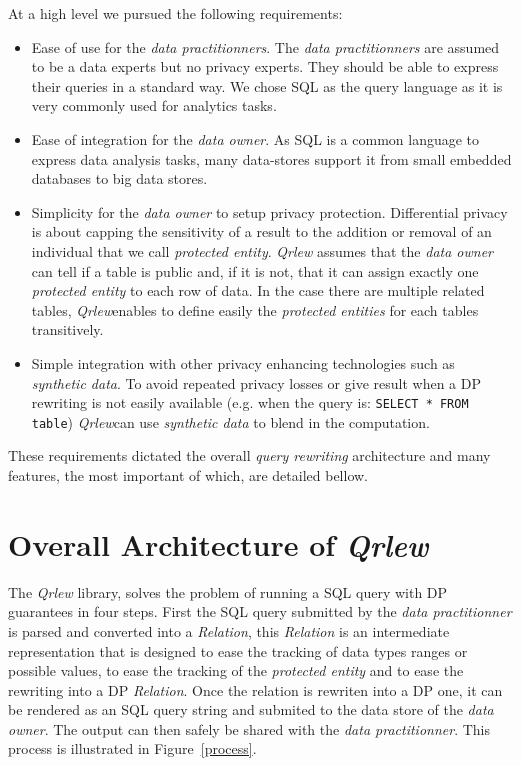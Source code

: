 \documentclass[letterpaper]{article} %
\newcommand{\qrlew}{\emph{Qrlew}}
\begin{document}
At a high level we pursued the following requirements:
\begin{itemize}
    \item Ease of use for the \emph{data practitionners}. The \emph{data practitionners} are assumed to be a data experts but no privacy experts. They should be able to express their queries in a standard way. We chose SQL as the query language as it is very commonly used for analytics tasks.
    \item Ease of integration for the \emph{data owner}. As SQL is a common language to express data analysis tasks, many data-stores support it from small embedded databases to big data stores.
    \item Simplicity for the \emph{data owner} to setup privacy protection. Differential privacy is about capping the sensitivity of a result to the addition or removal of an individual that we call \emph{protected entity}. \qrlew{} assumes that the \emph{data owner} can tell if a table is public and, if it is not, that it can assign exactly one \emph{protected entity} to each row of data. In the case there are multiple related tables, \qrlew enables to define easily the \emph{protected entities} for each tables transitively.
    \item Simple integration with other privacy enhancing technologies such as \emph{synthetic data}. To avoid repeated privacy losses or give result when a DP rewriting is not easily available (e.g. when the query is: \texttt{SELECT * FROM table}) \qrlew can use \emph{synthetic data} to blend in the computation.
\end{itemize}

These requirements dictated the overall \emph{query rewriting} architecture and many features, the most important of which, are detailed bellow.

\section{Overall Architecture of \qrlew}

The \qrlew{} library, solves the problem of running a SQL query with DP guarantees in four steps. First the SQL query submitted by the \emph{data practitionner} is parsed and converted into a \emph{Relation}, this \emph{Relation} is an intermediate representation that is designed to ease the tracking of data types ranges or possible values, to ease the tracking of the \emph{protected entity} and to ease the rewriting into a DP \emph{Relation}. Once the relation is rewriten into a DP one, it can be rendered as an SQL query string and submited to the data store of the \emph{data owner}. The output can then safely be shared with the \emph{data practitionner}. This process is illustrated in Figure~\ref{process}.
\end{document}
